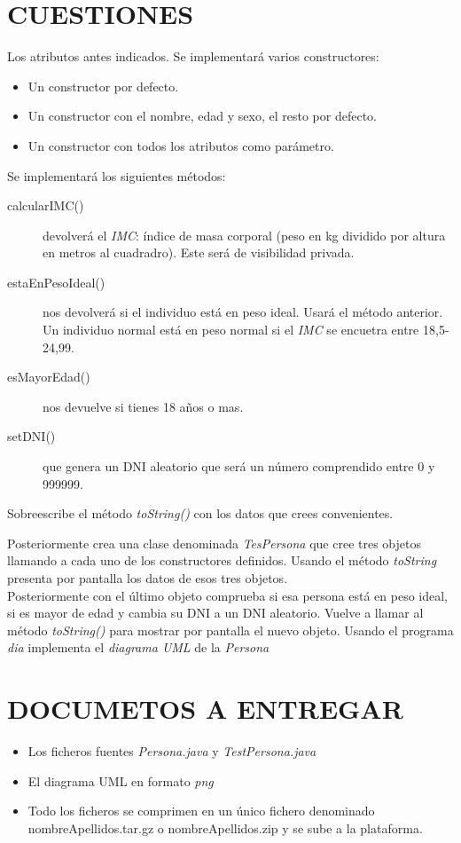 \documentclass[addpoints]{exam}
\begin{document}
\section{CUESTIONES}
\begin{questions}
\question[\half] Los atributos antes indicados.
\question[1] Se implementará varios constructores:
\begin{itemize}
\item Un constructor por defecto.
\item Un constructor con el nombre, edad y sexo, el resto por defecto.
\item Un constructor con todos los atributos como parámetro.
\end{itemize}
\question[2]
Se implementará los siguientes métodos:
\begin{description}
\item[calcularIMC()] devolverá el \emph{IMC}: índice de masa corporal (peso en kg dividido por altura en metros al cuadradro). Este será de visibilidad privada.
\item[estaEnPesoIdeal()] nos devolverá si el individuo está en peso ideal. Usará el método anterior. Un individuo normal está en peso normal si el \emph{IMC} se encuetra entre 18,5-24,99.
\item[esMayorEdad()] nos devuelve si tienes 18 años o mas.
\item[setDNI()] que genera un DNI aleatorio que será un número comprendido entre 0 y 999999.
\end{description}
\question[\half]
Sobreescribe el método \emph{toString()} con los datos que crees convenientes.

\question[1\half]
Posteriormente crea una clase denominada \emph{TesPersona} que cree tres objetos llamando a cada uno de los constructores definidos. Usando el método \emph{toString} presenta por pantalla los datos de esos tres objetos.\\
\question[1] Posteriormente con el último objeto comprueba si esa persona está en peso ideal, si es mayor de edad y cambia su DNI a un DNI aleatorio. Vuelve a llamar al método \emph{toString()} para mostrar por pantalla el nuevo objeto.
\question[1\half] Usando el programa \emph{dia} implementa el \emph{diagrama UML} de la \emph{Persona}
\end{questions}


\section{DOCUMETOS A ENTREGAR}
\begin{itemize}
\item Los ficheros fuentes \emph{Persona.java} y \emph{TestPersona.java}
\item El diagrama UML en formato \emph{png}
\item Todo los ficheros se comprimen en un único fichero denominado nombreApellidos.tar.gz o nombreApellidos.zip y se sube a la plataforma.  
\end{itemize}
\end{document}
